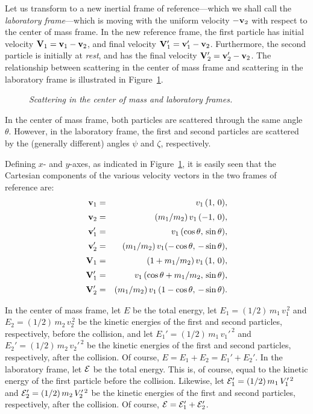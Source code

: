 Let us transform
to a new inertial frame of reference---which we shall call the {\em laboratory frame}---which is moving with the uniform velocity $-{\bf v}_2$ with respect to
the center of mass frame. In the new reference frame, the first
particle has initial velocity ${\bf V}_1= {\bf v}_1-{\bf v}_2$, and
final velocity ${\bf V}_1' = {\bf v}_1'-{\bf v}_2$. Furthermore, the second particle
is initially at {\em rest}, and has the final velocity ${\bf V}_2' = {\bf v}_2'-{\bf v}_2$. The relationship between scattering in the center of mass frame
and scattering in the laboratory frame is illustrated in Figure~\ref{lab}.

\begin{figure}
\epsfysize=1.8in
\centerline{}
\caption{\em Scattering in the center of mass and laboratory frames.}\label{lab}
\end{figure}

In the center of mass frame, both particles are scattered through the same angle $\theta$. However, in the laboratory frame, the first and second particles
are scattered by the (generally different) angles $\psi$ and $\zeta$,
respectively.

Defining $x$- and $y$-axes, as indicated in Figure~\ref{lab}, it is easily
seen that the Cartesian components of the various velocity vectors in the
two frames of reference are:
\begin{eqnarray}\label{e7.51}
{\bf v}_1 &=& v_1\,(1,\, 0),\\[0.5ex]
{\bf v}_2 &=&(m_1/m_2)\,v_1\,(-1,\,0),\\[0.5ex]
{\bf v}_1' &=& v_1\,(\cos\theta,\,\sin\theta),\\[0.5ex]
{\bf v}_2' &=&(m_1/m_2)\,v_1(-\cos\theta,\,-\sin\theta),\\[0.5ex]
{\bf V}_1 &=& (1+m_1/m_2)\,v_1\,(1,\,0),\\[0.5ex]
{\bf V}_1'&=& v_1\,(\cos\theta+m_1/m_2,\,\sin\theta),\\[0.5ex]
{\bf V}_2' &=& (m_1/m_2)\,v_1\,(1-\cos\theta,\,-\sin\theta).\label{e7.57}
\end{eqnarray}

In the center of mass frame, let $E$ be the total energy,  let $E_1=(1/2)\,m_1\,v_1^{\,2}$ and $E_2=(1/2)\,m_2\,v_2^{\,2}$ be the kinetic energies of the first and second particles, respectively, before the collision, and let
$E_1'=(1/2)\,m_1\,v_1'^{\,2}$ and $E_2'=(1/2)\,m_2\,v_2'^{\,2}$ be the kinetic energies of the first and second particles, respectively, after the collision. Of course, $E=E_1+E_2=E_1'+E_2'$. 
In the laboratory frame, let ${\cal E}$ be the total energy. This is, of course,
equal to the kinetic energy of the first particle before the collision. Likewise,
let ${\cal E}_1'=(1/2)\,m_1\,V_1'^{\,2}$ and ${\cal E}_2'=(1/2)\,m_2\,V_2'^{\,2}$ be the kinetic energies of the first and second particles, respectively, after the collision. Of course, ${\cal E} = {\cal E}_1' + {\cal E}_2'$. 

